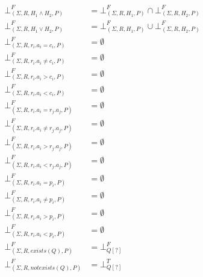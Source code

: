 \begin{mydef}
	\begin{align*}
		\bot^F_{(\Sigma,R,H_1 \land H_2,P)} & = \bot^F_{(\Sigma,R,H_1,P)} \cap \bot^F_{(\Sigma,R,H_2,P)} \\
		\bot^F_{(\Sigma,R,H_1 \lor H_2,P)} & = \bot^F_{(\Sigma,R,H_1,P)} \cup \bot^F_{(\Sigma,R,H_2,P)} \\
		\bot^F_{(\Sigma,R,r_i.a_i = c_i,P)} & =\emptyset \\
		\bot^F_{(\Sigma,R,r_i.a_i \neq c_i,P)} & = \emptyset \\
		\bot^F_{(\Sigma,R,r_i.a_i > c_i,P)} & =\emptyset \\
		\bot^F_{(\Sigma,R,r_i.a_i < c_i,P)} & =\emptyset \\
		\bot^F_{(\Sigma,R,r_i.a_i = r_j.a_j,P)} & = \emptyset \\
		\bot^F_{(\Sigma,R,r_i.a_i \neq r_j.a_j,P)} & = \emptyset \\
		\bot^F_{(\Sigma,R,r_i.a_i > r_j.a_j,P)} & = \emptyset \\
		\bot^F_{(\Sigma,R,r_i.a_i < r_j.a_j,P)} & = \emptyset \\
		\bot^F_{(\Sigma,R,r_i.a_i = p_i,P)} & = \emptyset\\
		\bot^F_{(\Sigma,R,r_i.a_i \neq p_i,P)} & = \emptyset \\
		\bot^F_{(\Sigma,R,r_i.a_i > p_i,P)} & = \emptyset\\
		\bot^F_{(\Sigma,R,r_i.a_i < p_i,P)} & = \emptyset\\
		\bot^F_{(\Sigma,R,exists(Q),P)} & = \bot^F_{Q[?]} \\
		\bot^F_{(\Sigma,R,notexists(Q),P)} & = \bot^T_{Q[?]}\\
	\end{align*}
\end{mydef}
\fi


\iffalse

